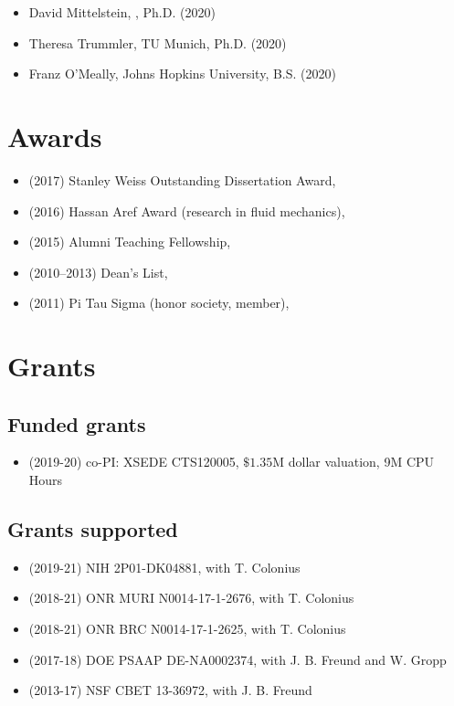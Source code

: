 \begin{itemize}
    \item David Mittelstein, \CIT, Ph.D. (2020)
    \item Theresa Trummler, TU Munich, Ph.D. (2020)
    \item Franz O'Meally, Johns Hopkins University, B.S. (2020)
\end{itemize}

\section{Awards}

\begin{itemize}
    \item (2017) Stanley Weiss Outstanding Dissertation Award, \UIUC
    \item (2016) Hassan Aref Award (research in fluid mechanics), \UIUC
    \item (2015) Alumni Teaching Fellowship, \UIUC
    \item (2010--2013) Dean's List, \UMD
    \item (2011) Pi Tau Sigma (honor society, member), \UMD
\end{itemize}

\section{Grants}

\subsection{Funded grants}

\begin{itemize}
    \item (2019-20) co-PI: XSEDE CTS120005, $\$1.35$M dollar valuation, 9M CPU Hours
\end{itemize}

\subsection{Grants supported}

\begin{itemize}
    \item (2019-21) NIH 2P01-DK04881, with T. Colonius
    \item (2018-21) ONR MURI N0014-17-1-2676, with T. Colonius
    \item (2018-21) ONR BRC N0014-17-1-2625, with T. Colonius
    \item (2017-18) DOE PSAAP DE-NA0002374, with J. B. Freund and W. Gropp
    \item (2013-17) NSF CBET 13-36972, with J. B. Freund
\end{itemize}

